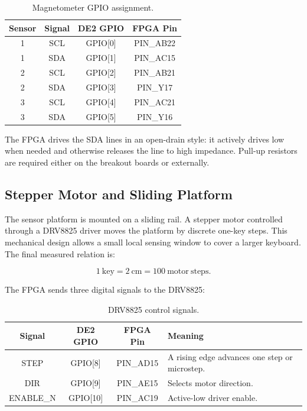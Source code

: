 \begin{table}[H]
    \centering
    \caption{Magnetometer GPIO assignment.}
    \label{tab:magnetometer_gpio}
    \renewcommand{\arraystretch}{1.2}
    \begin{tabular}{c c c c}
        \toprule
        \textbf{Sensor} & \textbf{Signal} & \textbf{DE2 GPIO} & \textbf{FPGA Pin} \\
        \midrule
        1 & SCL & GPIO[0] & PIN\_AB22 \\
        1 & SDA & GPIO[1] & PIN\_AC15 \\
        2 & SCL & GPIO[2] & PIN\_AB21 \\
        2 & SDA & GPIO[3] & PIN\_Y17 \\
        3 & SCL & GPIO[4] & PIN\_AC21 \\
        3 & SDA & GPIO[5] & PIN\_Y16 \\
        \bottomrule
    \end{tabular}
\end{table}

The FPGA drives the SDA lines in an open-drain style: it actively drives low when needed and otherwise releases the line to high impedance. Pull-up resistors are required either on the breakout boards or externally.

\subsection{Stepper Motor and Sliding Platform}

The sensor platform is mounted on a sliding rail. A stepper motor controlled through a DRV8825 driver moves the platform by discrete one-key steps. This mechanical design allows a small local sensing window to cover a larger keyboard. The final measured relation is:

\begin{equation}
    1~\mathrm{key} = 2~\mathrm{cm} = 100~\mathrm{motor~steps}.
\end{equation}

The FPGA sends three digital signals to the DRV8825:

\begin{table}[H]
    \centering
    \caption{DRV8825 control signals.}
    \label{tab:drv8825_gpio}
    \renewcommand{\arraystretch}{1.2}
    \begin{tabular}{c c c p{6.5cm}}
        \toprule
        \textbf{Signal} & \textbf{DE2 GPIO} & \textbf{FPGA Pin} & \textbf{Meaning} \\
        \midrule
        STEP & GPIO[8] & PIN\_AD15 & A rising edge advances one step or microstep. \\
        DIR & GPIO[9] & PIN\_AE15 & Selects motor direction. \\
        ENABLE\_N & GPIO[10] & PIN\_AC19 & Active-low driver enable. \\
        \bottomrule
    \end{tabular}
\end{table}


